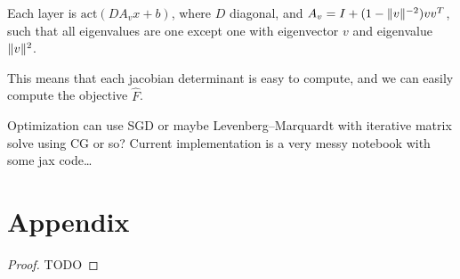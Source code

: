 \documentclass{scrartcl}
\DeclarePairedDelimiter{\norm}{\lVert}{\rVert}
\begin{document}
Each layer is $\text{act}(DA_vx + b)$, where $D$ diagonal, and $A_v = I
+ (1 - \norm{v}^{-2})vv^T$, such that all eigenvalues are one
except one with eigenvector $v$ and eigenvalue $\norm{v}^2$.

This means that each jacobian determinant is easy to compute, and we can easily
compute the objective $\hat F$.

Optimization can use SGD or maybe Levenberg–Marquardt with iterative matrix
solve using CG or so? Current implementation is a very messy notebook with some
jax code\dots

\section*{Appendix}

\begin{proof}
TODO
\iffalse
Assuming $q = N(\hat{\mu}, \hat{\Sigma})$ and differentiating by $\hat{\mu}$ and
a symmetric $\hat{\Sigma}$ gives us

\begin{align*}
\hat{\mu} &= \hat{\Sigma}\overline{\nabla \log p(\theta_i)} + \overline{\theta_i}
C &= \hat{\Sigma}P\hat{\Sigma} \\
\end{align*}

where
\begin{align*}
P &= \Cov{\nabla \log p(\theta_i), \theta_i} \\
C &= \Cov{\theta_i, \theta_i} \\
\overline{y_i} &= \frac{1}{N}\sum_i y_i
\end{align*}

TODO\dots
\fi
\end{proof}
\end{document}

